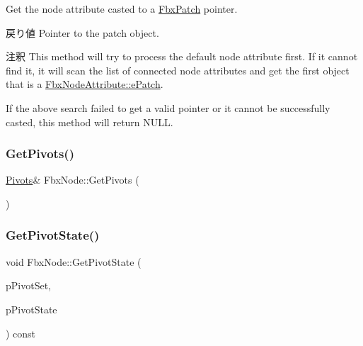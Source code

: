 Get the node attribute casted to a \hyperlink{class_fbx_patch}{Fbx\+Patch} pointer. \begin{DoxyReturn}{戻り値}
Pointer to the patch object. 
\end{DoxyReturn}
\begin{DoxyRemark}{注釈}
This method will try to process the default node attribute first. If it cannot find it, it will scan the list of connected node attributes and get the first object that is a \hyperlink{class_fbx_node_attribute_a08e1669d3d1a696910756ab17de56d6aa22755745b03034d2d98691279f4b2adf}{Fbx\+Node\+Attribute\+::e\+Patch}. 

If the above search failed to get a valid pointer or it cannot be successfully casted, this method will return {\ttfamily N\+U\+LL}. 
\end{DoxyRemark}
\mbox{\label{class_fbx_node_a00f712842fd208697db1d7bac729b7ea}} 
\subsubsection{\texorpdfstring{Get\+Pivots()}{GetPivots()}}
{\footnotesize\ttfamily \hyperlink{class_fbx_node_1_1_pivots}{Pivots}\& Fbx\+Node\+::\+Get\+Pivots (\begin{DoxyParamCaption}{ }\end{DoxyParamCaption})}

\mbox{\label{class_fbx_node_a92c29d9151e6b490c27ca0831a52d566}} 
\subsubsection{\texorpdfstring{Get\+Pivot\+State()}{GetPivotState()}}
{\footnotesize\ttfamily void Fbx\+Node\+::\+Get\+Pivot\+State (\begin{DoxyParamCaption}\item[{\hyperlink{class_fbx_node_ae62b7311ac4727654cdf1ebd5cbf7343}{E\+Pivot\+Set}}]{p\+Pivot\+Set,  }\item[{\hyperlink{class_fbx_node_a153fc75958227fc6728a2233b630b58a}{E\+Pivot\+State} \&}]{p\+Pivot\+State }\end{DoxyParamCaption}) const}

